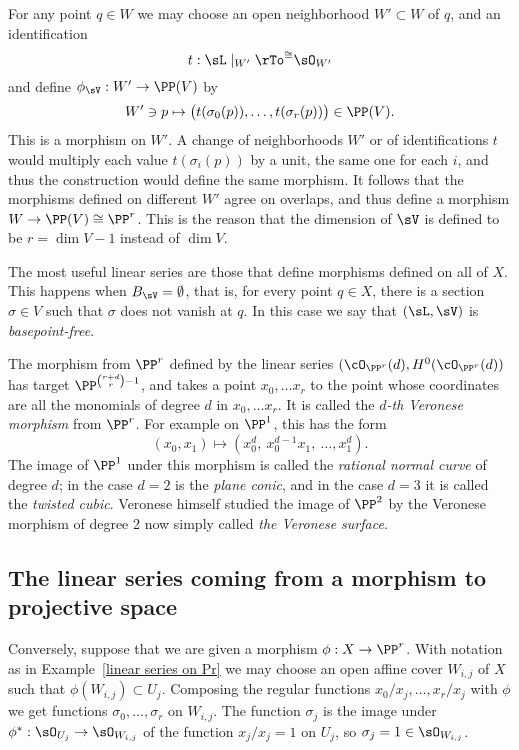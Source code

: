 For any point $q\in W$ we  may choose an open neighborhood $W'\subset W$ of $q$, and an identification 
$$
t: \sL\mid_{W'} \rTo^{\cong} \sO_{W'}
$$
and define $\phi_{\sV}: W' \to \PP(V)$ by 
$$
W'\ni p \mapsto \bigl(t(\sigma_{0}(p)),\dots, t(\sigma_{r}(p))\bigr) \in \PP(V).
$$
This  is a morphism on $W'$. A change of neighborhoods $W'$ or of identifications $t$ would multiply
each value $t(\sigma_{i}(p))$ by a unit, the same one for each $i$, and thus the construction would define the same morphism. It follows that the morphisms
defined on different $W'$ agree on overlaps, and thus define a morphism $W \to \PP(V) \cong \PP^r$. This is the reason
that the dimension of $\sV$ is defined to be $r=\dim V -1$ instead of $\dim V$.

The most useful linear series are those that define morphisms defined on all of $X$. This happens when $B_\sV = \emptyset$,
that is, for every point $q\in X$, there is a section $\sigma \in V$ such that $\sigma$ does not vanish at $q$. In this case we say that $(\sL, \sV)$ is \emph{basepoint-free}.

\begin{example}\label{Veronese definition}
The morphism from $\PP^r$ defined by the  linear series $(\cO_{\PP^r}(d), H^0(\cO_{\PP^r}(d))$ has target
$\PP^{{r+d\choose r}-1}$, and takes a point $x_0,\dots x_r$ to the point whose coordinates are all the monomials of
degree $d$ in $x_0,\dots x_r$. It is called the \emph{$d$-th Veronese morphism} from $\PP^r$. For example on $\PP^1$, this has the form
$$
(x_0,x_1) \mapsto (x_0^d,\ x_0^{d-1}x_1,\ \dots,x_1^d).
$$
The image of $\PP^1$ under this morphism is called the \emph{rational normal curve} of degree $d$; in the case $d=2$ is the
\emph{plane conic}, and in the case $d=3$ it is called the \emph{twisted cubic}. Veronese himself studied the image of $\PP^2$
by the Veronese morphism of degree 2 now simply called \emph{the Veronese surface}.
\end{example}


\subsection{The linear series coming from a morphism to projective space}\label{series from morphism}

Conversely, suppose that we are given a morphism $\phi: X\to \PP^{r}$. With notation as in Example~\ref{linear series on Pr} we may choose an open affine cover $W_{i,j}$ of $X$ such that $\phi(W_{i,j})\subset U_{j}$. Composing the regular
functions
$x_{0}/x_{j},\dots, x_{r}/x_{j}$ with $\phi$ we get functions $\sigma_{0},\dots,\sigma_{r}$ on $W_{i,j}$.  The function $\sigma_{j}$ is the image under $\phi^*: \sO_{U_j} \to \sO_{W_{i,j}}$ of the function $x_j/x_j = 1$ on $U_{j}$, so $\sigma_j = 1\in \sO_{W_{i,j}}$. 

